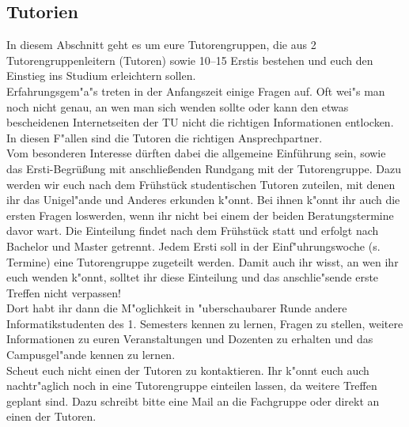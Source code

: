 \subsection{Tutorien}



In diesem Abschnitt geht es um eure Tutorengruppen, die aus 2 Tutorengruppenleitern (Tutoren) sowie 10--15 Erstis bestehen und euch den Einstieg ins Studium erleichtern sollen.\\
Erfahrungsgem"a"s treten in der Anfangszeit einige Fragen auf. Oft wei"s man noch nicht genau, an wen man sich wenden sollte oder kann den etwas bescheidenen Internetseiten der TU nicht die richtigen Informationen entlocken. In diesen F"allen sind die Tutoren die richtigen Ansprechpartner.\\

Vom besonderen Interesse dürften dabei die allgemeine Einführung sein,
sowie das Ersti-Begrüßung mit anschließenden Rundgang mit der
Tutorengruppe.
Dazu werden wir euch nach dem Frühstück studentischen 
Tutoren zuteilen, mit denen ihr das Unigel"ande und Anderes erkunden 
k"onnt. Bei ihnen k"onnt ihr auch die ersten Fragen loswerden, wenn 
ihr nicht bei einem der beiden Beratungstermine davor wart.
Die Einteilung findet nach dem Frühstück statt und erfolgt nach
Bachelor und Master getrennt.
Jedem Ersti soll in der Einf"uhrungswoche (s. Termine) eine Tutorengruppe zugeteilt werden. Damit auch ihr wisst, an wen ihr euch wenden k"onnt, solltet ihr diese Einteilung und das anschlie"sende erste Treffen nicht verpassen!\\
Dort habt ihr dann die M"oglichkeit in "uberschaubarer Runde andere Informatikstudenten des 1. Semesters kennen zu lernen, Fragen zu stellen, weitere Informationen zu euren Veranstaltungen und Dozenten zu erhalten und das Campusgel"ande kennen zu lernen.\\
Scheut euch nicht einen der Tutoren zu kontaktieren. Ihr k"onnt euch auch nachtr"aglich noch in eine Tutorengruppe einteilen lassen, da weitere Treffen geplant sind. Dazu schreibt bitte eine Mail an die Fachgruppe  oder direkt an einen der Tutoren.\\

